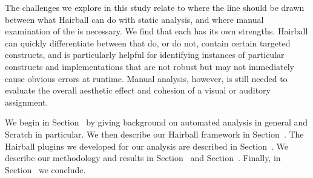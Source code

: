 The challenges we explore in this study relate to where the line should be
drawn between what Hairball can do with static analysis, and where manual
examination of the \sprogram{} is necessary.  We find that each has its own
strengths.  Hairball can quickly differentiate between  that do, or
do not, contain certain targeted constructs, and is particularly helpful for
identifying instances of particular constructs and implementations that are not
robust but may not immediately cause obvious errors at runtime.  Manual
analysis, however, is still needed to evaluate the overall aesthetic effect and
cohesion of a visual or auditory assignment.

We begin in Section~ by giving background on automated
analysis in general and Scratch in particular. We then describe our Hairball
framework in Section~. The Hairball plugins we
developed for our analysis are described in Section~. We
describe our methodology and results in Section~ and
Section~. Finally, in Section~ we
conclude.

